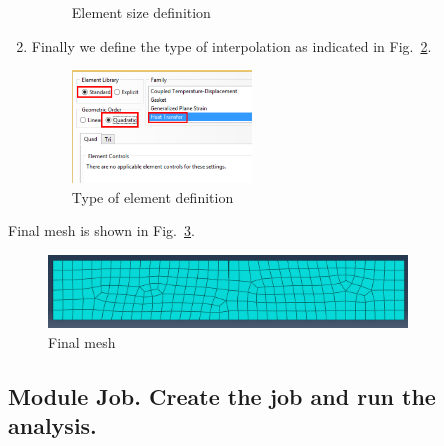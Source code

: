 \begin{enumerate}
\begin{figure}[!h]
\begin{center}
      \end{center}
      \caption{Element size definition}
      \label{mess03}
    \end{figure}
  \item Finally we define the type of interpolation as indicated in Fig.~\ref{mess04}.
    \begin{figure}[!h]
      \begin{center}
        \includegraphics[width=0.45\textwidth]{./body/images/mess04.pdf}
      \end{center}
      \caption{Type of element definition}
      \label{mess04}
    \end{figure}
  \end{enumerate}

  Final mesh is shown in Fig.~\ref{mess05}.
  \begin{figure}[!h]
    \begin{center}
      \includegraphics[width=0.85\textwidth]{./body/images/mess05}
    \end{center}
    \caption{Final mesh}
    \label{mess05}
  \end{figure}

  \subsection{Module Job. Create the job and run the analysis.}

